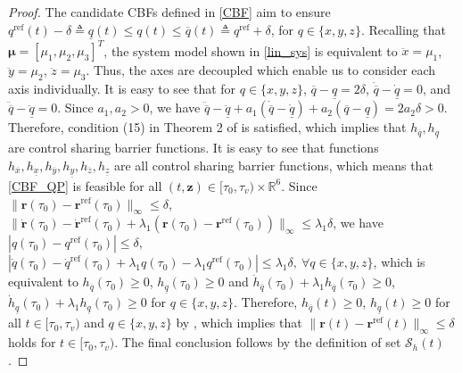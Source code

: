 \documentclass[journal,10pt]{IEEEtran}
\newcommand{\vect}[1]{\boldsymbol{\mathbf{#1}}}
\begin{document}
\begin{proof}
The candidate CBFs defined in \eqref{CBF} aim to ensure $q^{\text{ref}}(t)-\delta \triangleq \underline q(t)\leq q(t)\leq \overline q(t)\triangleq q^{\text{ref}}+\delta$, for $q\in \{x,y,z\}$. Recalling that $\vect{\mu} =[\mu_1,\mu_2,\mu_3]^T$, the system model shown in \eqref{lin_sys} is equivalent to $\ddot x=\mu_1$, $\ddot y=\mu_2$, $\ddot z=\mu_3$. Thus, the axes are decoupled which enable us to consider each axis individually. It is easy to see that for $q\in \{x,y,z\}$, $\overline q-\underline q=2\delta$, $\dot{\overline q}-\dot{\underline q}=0$, and $\ddot{\overline q}-\ddot{\underline q}=0$. Since $a_1,a_2>0$, we have $\ddot{\overline q}-\ddot{\underline q}+a_1(\dot{\overline q}-\dot{\underline q})+a_2(\overline q-\underline q)=2a_2\delta>0$. Therefore, condition (15) in Theorem 2 of \cite{xu2018constrained} is satisfied, which implies that $h_{\overline{q}},h_{\underline{q}}$ are control sharing barrier functions. It is easy to see that  functions $h_{\overline{x}},h_{\underline{x}},h_{\overline{y}},h_{\underline{y}},h_{\overline{z}},h_{\underline{z}}$ are all control sharing barrier functions, which means that \eqref{CBF_QP} is  feasible for all $(t,\vect{z})\in[\tau_0,\tau_v)\times\mathbb{R}^6$. Since $\|\vect{r}(\tau_0)-\vect{r}^{\text{ref}}(\tau_0) \|_{\infty} \leq \delta$, $\|\dot{\vect{r}}(\tau_0)-\dot{\vect{r}}^{\text{ref}}(\tau_0)+\lambda_1(\vect{r}(\tau_0)-\vect{r}^{\text{ref}}(\tau_0)) \|_{\infty} \leq \lambda_1\delta$, we have $|q(\tau_0)-q^{\text{ref}}(\tau_0)|\leq\delta$, 
$|\dot{q}(\tau_0)-\dot{q}^{\text{ref}}(\tau_0)+\lambda_1q(\tau_0)-\lambda_1q^{\text{ref}}(\tau_0)|\leq \lambda_1\delta,\ \forall  q\in\{x,y,z\}$, which is equivalent to $h_{\overline{q}}(\tau_0)\geq 0$, $h_{\underline{q}}(\tau_0)\geq0$ and  $\dot h_{\overline{q}}(\tau_0)+\lambda_1 h_{\overline{q}}(\tau_0)\geq0$, $\dot h_{\underline{q}}(\tau_0)+\lambda_1h_{\underline{q}}(\tau_0)\geq0$ for $q\in\{x,y,z\}$. Therefore,  $h_{\overline{q}}(t)\geq 0$, $h_{\underline{q}}(t)\geq 0$ for all $t \in [\tau_0,\tau_v)$ and $q\in\{x,y,z\}$ by \cite{xu2018constrained}, which implies that  $\|\vect{r}(t)-\vect{r}^{\text{ref}}(t) \|_{\infty} \leq \delta$ holds for $t \in [\tau_0,\tau_v)$. The final conclusion follows by the definition of set $\mathcal{S}_h(t)$.

\end{proof}
\end{document}
